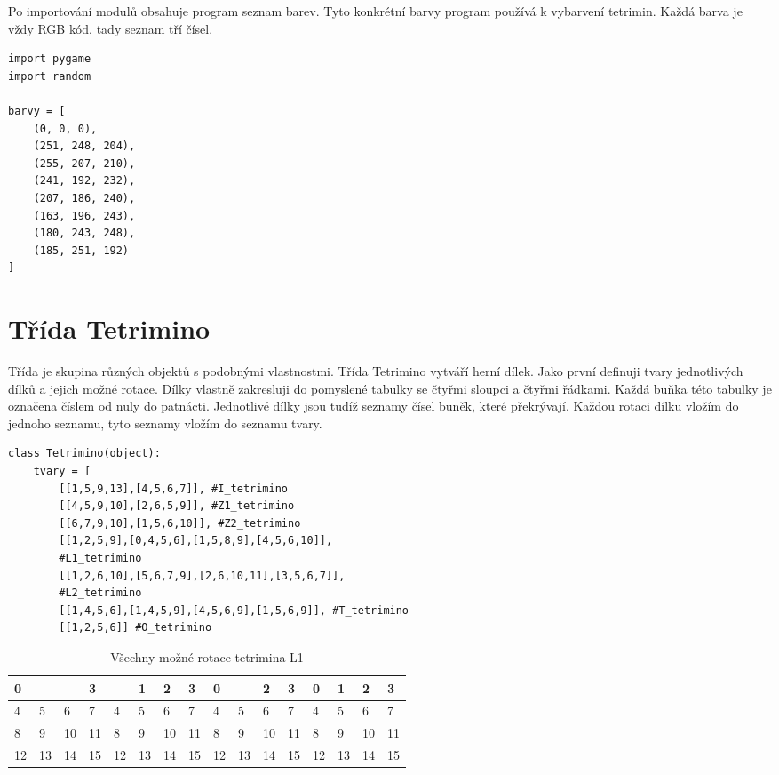 \documentclass[12pt]{report}			%
\begin{document}
Po importování modulů obsahuje program seznam barev. Tyto konkrétní barvy program používá k vybarvení tetrimin. Každá barva je vždy RGB kód, tady seznam tří čísel.
\begin{lstlisting}[title={Program tetris.py}, caption={Importování modulů a tvorba barev tetrimin}, 							label={lst:tetris.py}]
import pygame
import random

barvy = [
    (0, 0, 0),
    (251, 248, 204),
    (255, 207, 210),
    (241, 192, 232),
    (207, 186, 240),
    (163, 196, 243),
    (180, 243, 248),
    (185, 251, 192)
]
\end{lstlisting}

		\chapter{Třída Tetrimino}
Třída je skupina různých objektů s podobnými vlastnostmi. Třída Tetrimino vytváří herní dílek. Jako první definuji tvary jednotlivých dílků a jejich možné rotace. Dílky vlastně zakresluji do pomyslené tabulky se čtyřmi sloupci a čtyřmi řádkami. Každá buňka této tabulky je označena číslem od nuly do patnácti. Jednotlivé dílky jsou tudíž seznamy čísel buněk, které překrývají. Každou rotaci dílku vložím do jednoho seznamu, tyto seznamy vložím do seznamu tvary.
\begin{lstlisting}[title={Program tetris.py}, caption={Tvary tetrimin}, 							label={lst:tetris.py}]
class Tetrimino(object):
    tvary = [
        [[1,5,9,13],[4,5,6,7]], #I_tetrimino
        [[4,5,9,10],[2,6,5,9]], #Z1_tetrimino 
        [[6,7,9,10],[1,5,6,10]], #Z2_tetrimino
        [[1,2,5,9],[0,4,5,6],[1,5,8,9],[4,5,6,10]],
        #L1_tetrimino
        [[1,2,6,10],[5,6,7,9],[2,6,10,11],[3,5,6,7]],
        #L2_tetrimino
        [[1,4,5,6],[1,4,5,9],[4,5,6,9],[1,5,6,9]], #T_tetrimino
        [[1,2,5,6]] #O_tetrimino
\end{lstlisting}
\begin{table}[ht]
\centering
\begin{tabular}{|p{}|p{}|p{}|p{}||p{}|p{}|p{}|p{}||p{}|p{}|p{}|p{}||p{}|p{}|p{}|p{}|}
  \hline
  {0} & \cellcolor{gray!40}{1} & \cellcolor{gray!40}{2} & {3} & \cellcolor{gray!40}{0} & {1} & {2} & {3} & {0} & \cellcolor{gray!40}{1} & {2} & {3} & {0} & {1} & {2} & {3} \\
  \hline 
  4 & \cellcolor{gray!40}5 & 6 & 7 &\cellcolor{gray!40}4 & \cellcolor{gray!40}5 & \cellcolor{gray!40}6 & 7 & 4 & \cellcolor{gray!40}5 & 6 & 7 & \cellcolor{gray!40}4 & \cellcolor{gray!40}5 & \cellcolor{gray!40}6 & 7 \\
  \hline 
  8 & \cellcolor{gray!40}9 & 10 & 11 & 8 & 9 & 10 & 11 & \cellcolor{gray!40}8 & \cellcolor{gray!40}9 & 10 & 11 & 8 & 9 & \cellcolor{gray!40}10 & 11 \\
  \hline 
  12 & 13 & 14 & 15 & 12 & 13 & 14 & 15 & 12 & 13 & 14 & 15 & 12 & 13 & 14 & 15 \\
  \hline 
\end{tabular}
\caption{Všechny možné rotace tetrimina L1}
\label{table:ta}
\end{table}
\end{document}
